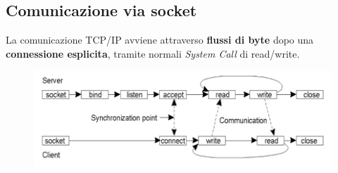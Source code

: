 \documentclass[12pt, a4paper]{article}
\begin{document}
    \subsection{Comunicazione via socket}
    La comunicazione TCP/IP avviene attraverso \textbf{flussi di byte} dopo una
    \textbf{connessione esplicita}, tramite normali \textit{System Call} di read/write.

    \begin{figure}[htbp]
        \centering
        \includegraphics[scale=0.7]{socketsteps.png}
    \end{figure}
\end{document}
